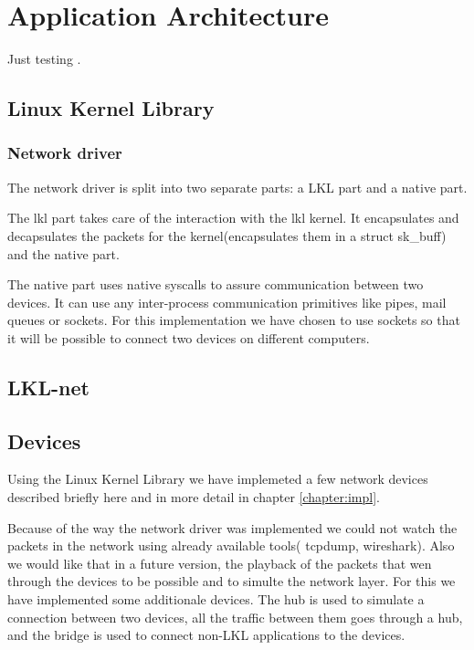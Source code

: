 \chapter{Application Architecture}
\label{chapter:arch}

Just testing \cite{linnetarch}.

\section{Linux Kernel Library}
\label{sec:lkl}


\subsection{Network driver}
\label{sec:net-driver}

The network driver is split into two separate parts: a LKL part and a native part.

The lkl part takes care of the interaction with the lkl kernel. It encapsulates
and decapsulates the packets for the kernel(encapsulates them in a struct sk_buff)
and the native part.

The native part uses native syscalls to assure communication between two devices.
It can use any inter-process communication primitives like pipes, mail queues or sockets.
For this implementation we have chosen to use sockets so that it will be possible
to connect two devices on different computers.


\section{LKL-net}
\label{sec:lkl-net}


\theproject

\section{Devices}
\label{sec:devices}

Using the Linux Kernel Library we have implemeted a few network devices described briefly
here and in more detail in chapter \ref{chapter:impl}.

Because of the way the network driver was implemented we could not watch the packets in the
network using already available tools( tcpdump, wireshark). Also we would like that in a future version,
the playback of the packets that wen through the devices to be possible and to simulte the network layer.
For this we have implemented some additionale devices. The hub is used to simulate a connection between 
two devices, all the traffic between them goes through a hub, and the bridge is used to connect non-LKL 
applications to the \text{\project} devices.

